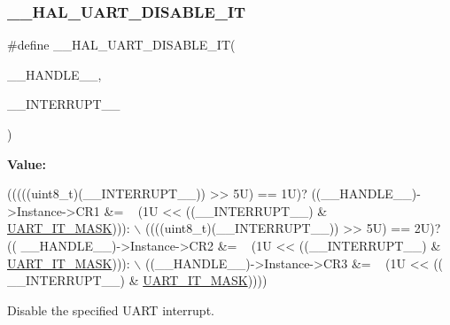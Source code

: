 \subsubsection{\texorpdfstring{\+\_\+\+\_\+\+H\+A\+L\+\_\+\+U\+A\+R\+T\+\_\+\+D\+I\+S\+A\+B\+L\+E\+\_\+\+IT}{\_\_HAL\_UART\_DISABLE\_IT}}
{\footnotesize\ttfamily \#define \+\_\+\+\_\+\+H\+A\+L\+\_\+\+U\+A\+R\+T\+\_\+\+D\+I\+S\+A\+B\+L\+E\+\_\+\+IT(\begin{DoxyParamCaption}\item[{}]{\+\_\+\+\_\+\+H\+A\+N\+D\+L\+E\+\_\+\+\_\+,  }\item[{}]{\+\_\+\+\_\+\+I\+N\+T\+E\+R\+R\+U\+P\+T\+\_\+\+\_\+ }\end{DoxyParamCaption})}

{\bfseries Value\+:}
\begin{DoxyCode}
(((((uint8\_t)(\_\_INTERRUPT\_\_)) >> 5U) == 1U)? ((\_\_HANDLE\_\_)->Instance->CR1 &= ~ (1U << ((\_\_INTERRUPT\_\_) & 
      \hyperlink{group___u_a_r_t___interruption___mask_ga869439269c26e8dee93d49b1c7e67448}{UART\_IT\_MASK}))): \(\backslash\)
                                                           ((((uint8\_t)(\_\_INTERRUPT\_\_)) >> 5U) == 2U)? ((
      \_\_HANDLE\_\_)->Instance->CR2 &= ~ (1U << ((\_\_INTERRUPT\_\_) & \hyperlink{group___u_a_r_t___interruption___mask_ga869439269c26e8dee93d49b1c7e67448}{UART\_IT\_MASK}))): \(\backslash\)
                                                           ((\_\_HANDLE\_\_)->Instance->CR3 &= ~ (1U << ((
      \_\_INTERRUPT\_\_) & \hyperlink{group___u_a_r_t___interruption___mask_ga869439269c26e8dee93d49b1c7e67448}{UART\_IT\_MASK}))))
\end{DoxyCode}


Disable the specified U\+A\+RT interrupt. 


